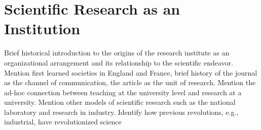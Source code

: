 \section{Scientific Research as an Institution}
Brief historical introduction to the origins of the research institute as an organizational arrangement and its relationship to the scientific endeavor. Mention first learned societies in England and France, brief history of the journal as the channel of communication, the article as the unit of research. Mention the ad-hoc connection between teaching at the university level and research at a university. Mention other models of scientific research such as the national laboratory and research in industry. Identify how previous revolutions, e.g., industrial, have revolutionized science 